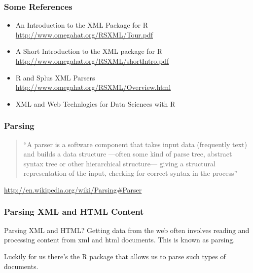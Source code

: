\documentclass{beamer}\usepackage[]{graphicx}\usepackage[]{color}
\begin{document}

\begin{frame}
\frametitle{Some References}

\begin{itemize}
 \item An Introduction to the XML Package for R \\
{\scriptsize \url{http://www.omegahat.org/RSXML/Tour.pdf}}
 \item A Short Introduction to the XML package for R \\
{\scriptsize \url{http://www.omegahat.org/RSXML/shortIntro.pdf}}
 \item R and Splus XML Parsers \\
 {\scriptsize \url{http://www.omegahat.org/RSXML/Overview.html}}
 \item XML and Web Technlogies for Data Sciences with R \\
\end{itemize}

\end{frame}


\begin{frame}
\frametitle{Parsing}

\begin{quotation}
``A parser is a software component that takes input data (frequently text) and builds a data structure ---often some kind of parse tree, abstract syntax tree or other hierarchical structure--- giving a structural representation of the input, checking for correct syntax in the process''
\end{quotation}

{\footnotesize 
\hspace{8mm} \url{http://en.wikipedia.org/wiki/Parsing\#Parser} \\
}

\end{frame}


\begin{frame}
\frametitle{Parsing XML and HTML Content}

\begin{block}{Parsing XML and HTML?}
Getting data from the web often involves reading and processing content from xml and html documents. This is known as parsing. 

\bigskip
Luckily for us there's the R package   that allows us to parse such types of documents.
\end{block}

\end{frame}
\end{document}

